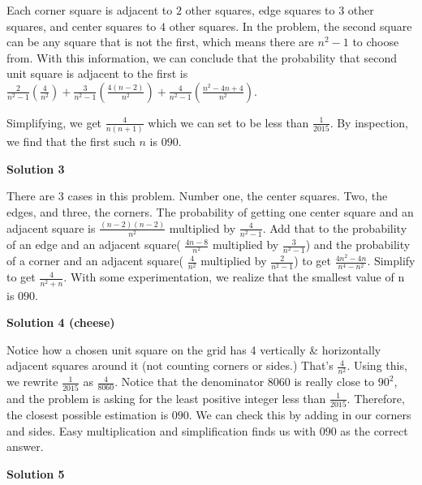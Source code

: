 \begin{enumerate}
 Each corner square is adjacent to $2$ other squares, edge squares to $3$ other squares, and center squares to $4$ other squares. In the problem, the second square can be any square that is not the first, which means there are $n^2-1$ to choose from. With this information, we can conclude that the probability that second unit square is adjacent to the first is $\frac{2}{n^2-1}(\frac{4}{n^2}) +\frac{3}{n^2-1}(\frac{4(n-2)}{n^2}) +\frac{4}{n^2-1}(\frac{n^2-4n+4}{n^2})$.

 Simplifying, we get $\frac{4}{n(n+1)}$ which we can set to be less than $\frac{1}{2015}$. By inspection, we find that the first such $n$ is $\boxed{090}$.

 


 



\textbf{Solution 3}

There are 3 cases in this problem. Number one, the center squares. Two, the edges, and three, the corners. The probability of getting one center square and an adjacent square is $\frac{(n-2)(n-2)}{n^2}$ multiplied by $\frac{4}{n^2 -1}$. Add that to the probability of an edge and an adjacent square( $\frac{4n-8}{n^2}$ multiplied by  $\frac{3}{n^2-1}$) and the probability of a corner and an adjacent square( $\frac{4}{n^2}$ multiplied by  $\frac{2}{n^2-1}$) to get  $\frac{4n^2-4n}{n^4-n^2}$. Simplify to get  $\frac{4}{n^2+n}$. With some experimentation, we realize that the smallest value of n is $\boxed{090}$.

 


 



\textbf{Solution 4 (cheese)}

Notice how a chosen unit square on the grid has 4 vertically & horizontally adjacent squares around it (not counting corners or sides.) That's $\frac{4}{n^2}$. Using this, we rewrite $\frac{1}{2015}$ as $\frac{4}{8060}$. Notice that the denominator $8060$ is really close to $90^2$, and the problem is asking for the least positive integer less than $\frac{1}{2015}$. Therefore, the closest possible estimation is $\boxed{090}$. We can check this by adding in our corners and sides. Easy multiplication and simplification finds us with $\boxed{090}$ as the correct answer.

 



\textbf{Solution 5}


\end{enumerate}
